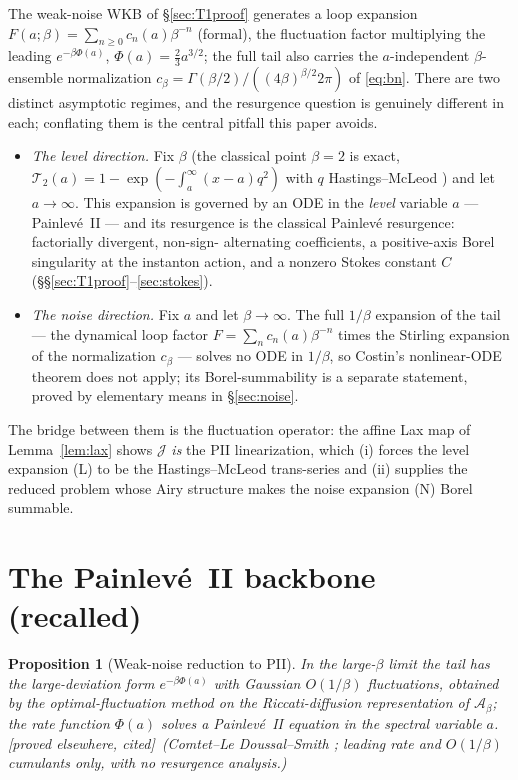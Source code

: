 \documentclass[11pt,reqno]{amsart}
\theoremstyle{plain}
\newtheorem{proposition}[theorem]{Proposition}
\theoremstyle{definition}
\theoremstyle{remark}
\newcommand{\SAO}{\mathcal{A}_\beta}
\newcommand{\tagP}{{\footnotesize\textsf{[proved elsewhere, cited]}}}
\begin{document}
The weak-noise WKB of \S\ref{sec:T1proof} generates a loop expansion
$F(a;\beta)=\sum_{n\ge0}c_n(a)\beta^{-n}$ (formal), the fluctuation factor multiplying the leading
$e^{-\beta\Phi(a)}$, $\Phi(a)=\tfrac23a^{3/2}$; the full tail also carries the $a$-independent
$\beta$-ensemble normalization $c_\beta=\Gamma(\beta/2)/((4\beta)^{\beta/2}2\pi)$ of \eqref{eq:bn}.
There are two distinct asymptotic regimes, and the resurgence question is genuinely different in
each; conflating them is the central pitfall this paper avoids.

\begin{itemize}
\item[\textbf{(L)}] \emph{The level direction.} Fix $\beta$ (the classical point $\beta=2$ is exact,
$\mathcal T_2(a)=1-\exp(-\int_a^\infty(x-a)q^2)$ with $q$ Hastings--McLeod \cite{TW1994}) and let
$a\to\infty$. This expansion is governed by an ODE in the \emph{level} variable $a$ --- Painlev\'e~II
--- and its resurgence is the classical Painlev\'e resurgence: factorially divergent, non-sign-
alternating coefficients, a positive-axis Borel singularity at the instanton action, and a nonzero
Stokes constant $C$ (\S\S\ref{sec:T1proof}--\ref{sec:stokes}).
\item[\textbf{(N)}] \emph{The noise direction.} Fix $a$ and let $\beta\to\infty$. The full $1/\beta$
expansion of the tail --- the dynamical loop factor $F=\sum_n c_n(a)\beta^{-n}$ times the Stirling
expansion of the normalization $c_\beta$ --- solves no ODE in $1/\beta$, so Costin's nonlinear-ODE
theorem does not apply; its Borel-summability is a separate statement, proved by elementary means in
\S\ref{sec:noise}.
\end{itemize}

The bridge between them is the fluctuation operator: the affine Lax map of
Lemma~\ref{lem:lax} shows $\mathcal J$ \emph{is} the PII linearization, which (i) forces the level
expansion (L) to be the Hastings--McLeod trans-series and (ii) supplies the reduced problem whose
Airy structure makes the noise expansion (N) Borel summable.

\section{The Painlev\'e~II backbone (recalled)}\label{sec:backbone}

\begin{proposition}[Weak-noise reduction to PII]\label{prop:pii}
In the large-$\beta$ limit the tail has the large-deviation form $e^{-\beta\Phi(a)}$ with Gaussian
$O(1/\beta)$ fluctuations, obtained by the optimal-fluctuation method on the Riccati-diffusion
representation of $\SAO$; the rate function $\Phi(a)$ solves a Painlev\'e~II equation in the spectral
variable $a$. \tagP\ \emph{(Comtet--Le Doussal--Smith \cite{CLDS}; leading rate and $O(1/\beta)$
cumulants only, with no resurgence analysis.)}
\end{proposition}
\end{document}
